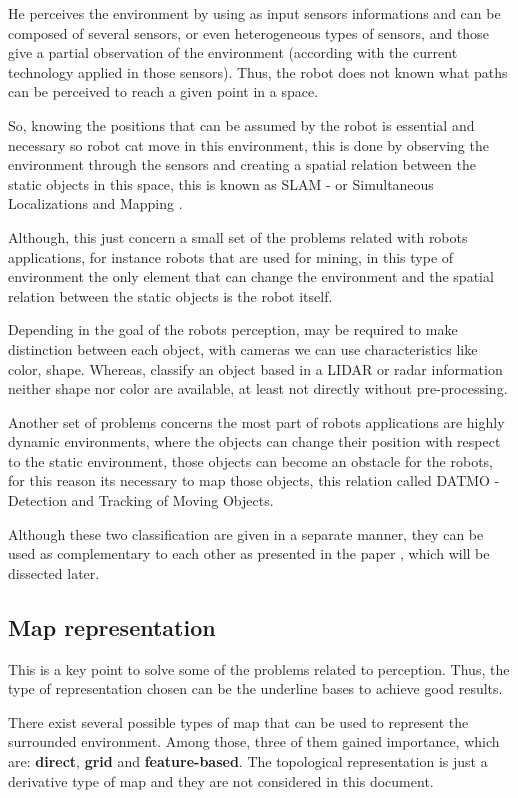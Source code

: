 He perceives the environment by using as input sensors informations and can be composed of several sensors, or even heterogeneous types of sensors, and those give a partial observation of the environment (according with the current technology applied in those sensors). Thus, the robot does not known what paths can be perceived to reach a given point in a space.

So, knowing the positions that can be assumed by the robot is essential and necessary so robot cat move in this environment, this is done by observing the environment through the sensors and creating a spatial relation between the static objects in this space, this is known as SLAM - or Simultaneous Localizations and Mapping \cite{iyengar1991autonomous}.

Although, this just concern a small set of the problems related with robots applications, for instance robots that are used for mining, in this type of environment the only element that can change the environment and the spatial relation between the static objects is the robot itself. 

Depending in the goal of the robots perception, may be required to make distinction between each object, with cameras we can use characteristics like color, shape. Whereas, classify an object based in a LIDAR or radar information neither shape nor color are available, at least not directly without pre-processing.

Another set of problems concerns the most part of robots applications are highly dynamic environments, where the objects can change their position with respect to the static environment, those objects can become an obstacle for the robots, for this reason its necessary to map those objects, this relation called DATMO - Detection and Tracking of Moving Objects.

Although these two classification are given in a separate manner, they can be used as complementary to each other as presented in the paper \cite{Wang04a}, which will be dissected later.

\subsection{Map representation}

This is a key point to solve some of the problems related to perception. Thus, the type of representation chosen can be the underline bases to achieve good results.

There exist several possible types of map that can be used to represent the surrounded environment. Among those, three of them gained importance, which are: \textbf{direct}, \textbf{grid} and \textbf{feature-based}. The topological representation is just a derivative type of map and they are not considered in this document.

